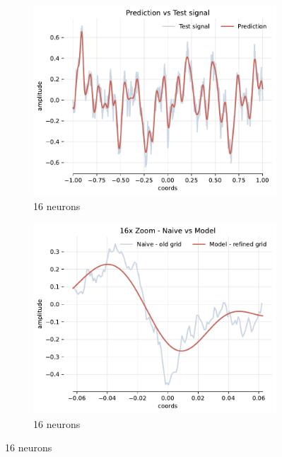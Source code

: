 \begin{figure}[h]
    \centering
    \begin{subfigure}[b]{0.32\textwidth}
        \centering
        \includegraphics[width=\textwidth]{img/ch3/pred-1hl-16hf-2hz.pdf}
        \caption{16 neurons}
        \label{fig:pred-1hl-16hf-2hz}
    \end{subfigure}
    \begin{subfigure}[b]{0.32\textwidth}
        \centering
        \includegraphics[width=\textwidth]{img/ch3/16x-zoom-1hl-16hf-2hz.pdf}
        \caption{16 neurons}
        \label{fig:16x-zoom-1hl-16hf-2hz}
    \end{subfigure}

\end{figure}
